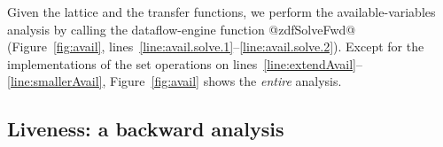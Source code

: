 \documentclass[blockstyle,preprint,natbib,nocopyrightspace]{sigplanconf}
\newcommand\linerangeref[2]{\mbox{lines~\ref{line:#1}--\ref{line:#2}}}
\def\authornote#1{\unskip\relax}
\newcommand{\simon}[1]{\authornote{SLPJ: #1}}
\newcommand\figref[1]{Figure~\ref{fig:#1}}
\begin{document}

Given the lattice and the transfer functions,
we perform the available-variables analysis by calling
the dataflow-engine function @zdfSolveFwd@ (\figref{avail},
\linerangeref{avail.solve.1}{avail.solve.2}). 
\simon{But this is really a lie. We actually call the transformation 
function!  I'm not quite sure how to fix this pedagogical point.
NR: It's true that we don't actually have a use for the results of an
independent available-variables analysis, other than to drive the
transformation in the next section.  But just because we have no use
for the results at present does not  make the example analysis
incorrect or invalid, and I think the pedagogy is sound.
}
Except for the implementations of the set operations on
\linerangeref{extendAvail}{smallerAvail}, 
\figref{avail} shows the \emph{entire} analysis.

\subsection{Liveness: a backward analysis} 
\end{document}
